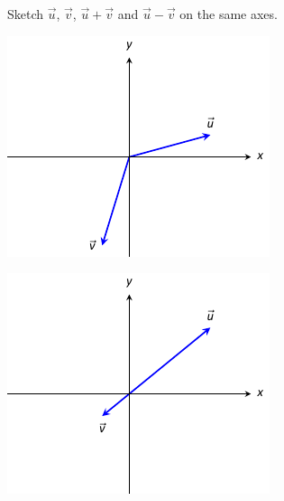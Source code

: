 
\begin{Exercise}[
name={},
title={}, 
difficulty=0,
origin={\cite{GHC}}]
Sketch $\vec u$, $\vec v$, $\vec u+\vec v$ and $\vec u-\vec v$ on the same axes.
\begin{multicols}{2}
\Question 
\begin{minipage}[m]{\linewidth}
\centering
\includegraphics[width=\linewidth]{vector_geometry/introduction_to_vectors_and_lines/figures/fig10_02_ex_11}
\end{minipage}
\Question
\begin{minipage}[m]{\linewidth}
\centering
\includegraphics[width=\linewidth]{vector_geometry/introduction_to_vectors_and_lines/figures/fig10_02_ex_13}

\end{minipage}
\end{multicols}
\end{Exercise}
